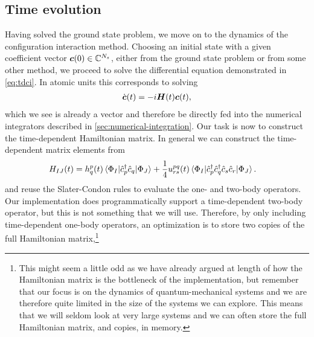         \subsection{Time evolution}
            Having solved the ground state problem, we move on to the dynamics
            of the configuration interaction method.
            Choosing an initial state with a given coefficient vector
            $\boldsymbol{c}(0) \in \mathbb{C}^{N_s}$, either from the ground state
            problem or from some other method, we proceed to solve the
            differential equation demonstrated in \autoref{eq:tdci}.
            In atomic units this corresponds to solving
            \begin{align}
                \dot{\boldsymbol{c}}(t) = -i\boldsymbol{H}(t)\boldsymbol{c}(t),
            \end{align}
            which we see is already a vector and therefore be directly fed into
            the numerical integrators described in
            \autoref{sec:numerical-integration}.
            Our task is now to construct the time-dependent Hamiltonian matrix.
            In general we can construct the time-dependent matrix elements from
            \begin{align}
                H_{IJ}(t)
                &=
                h^{p}_{q}(t)
                \mel*{\Phi_I}{\hat{c}_{p}^{\dagger}\hat{c}_{q}}{\Phi_J}
                + \frac{1}{4}u^{pq}_{rs}(t)
                \mel*{\Phi_I}{
                    \hat{c}_{p}^{\dagger}\hat{c}_{q}^{\dagger}\hat{c}_{s}\hat{c}_{r}
                }{\Phi_J}.
            \end{align}
            and reuse the Slater-Condon rules to evaluate the one- and two-body
            operators.
            Our implementation does programmatically support a time-dependent
            two-body operator, but this is not something that we will use.
            Therefore, by only including time-dependent one-body operators, an
            optimization is to store two copies of the full Hamiltonian
            matrix,\footnote{%
                This might seem a little odd as we have already argued at length
                of how the Hamiltonian matrix is the bottleneck of the
                implementation, but remember that our focus is on the dynamics
                of quantum-mechanical systems and we are therefore quite limited
                in the size of the systems we can explore.
                This means that we will seldom look at very large systems and we
                can often store the full Hamiltonian matrix, and copies, in
                memory.
            }
